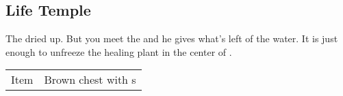 \subsection{Life Temple}
\label{map:life_temple}

The  dried up. But you meet the  and he gives  what's left of the water. It is just enough to unfreeze the healing plant in the center of .

\noindent\begin{tabularx}{\textwidth}[l]{lX}
	Item & Brown chest with \nameref{item:cure_potion}s
\end{tabularx}
